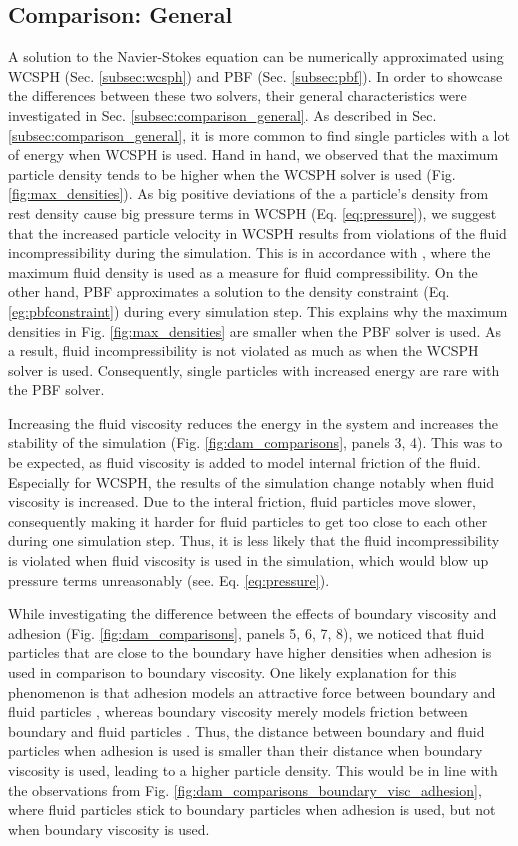 \documentclass[11pt, letterpaper, twocolumn]{article}
\begin{document}
\subsection{Comparison: General}
\label{disc:comparison_general}
A solution to the Navier-Stokes equation can be numerically approximated using WCSPH (Sec. \ref{subsec:wcsph}) and PBF (Sec. \ref{subsec:pbf}). In order to showcase the differences between these two solvers, their general characteristics were investigated in Sec. \ref{subsec:comparison_general}. As described in Sec. \ref{subsec:comparison_general},
it is more common to find single particles with a lot of energy when WCSPH is used. Hand in hand, we observed that the maximum particle density tends to be higher when the WCSPH solver is used (Fig. \ref{fig:max_densities}). As big positive deviations of the a particle's density from rest density cause big pressure terms in WCSPH (Eq. \ref{eq:pressure}), we suggest that
the increased particle velocity in WCSPH results from violations of the fluid incompressibility during the simulation. This is in accordance with \cite{macklin2013}, where the maximum fluid density is used as a measure for fluid compressibility. On the other hand, PBF approximates a solution to the density constraint (Eq. \ref{eg:pbfconstraint}) during 
every simulation step. This explains why the maximum densities in Fig. \ref{fig:max_densities} are smaller when the PBF solver is used. As a result, fluid incompressibility is not violated as much as when the WCSPH solver is used. Consequently, single particles with increased energy are rare with the PBF solver.  

Increasing the fluid viscosity reduces the energy in the system and increases the stability of the simulation (Fig. \ref{fig:dam_comparisons}, panels 3, 4). This was to be expected, as fluid viscosity is added to model internal friction of the fluid. Especially for WCSPH, the results of the simulation change notably when fluid viscosity is increased. Due 
to the interal friction, fluid particles move slower, consequently making it harder for fluid particles to get too close to each other during one simulation step. Thus, it is less likely that the fluid incompressibility is violated when fluid viscosity is used in the simulation, which would blow up pressure terms unreasonably (see. Eq. \ref{eq:pressure}).

While investigating the difference between the effects of boundary viscosity and adhesion (Fig. \ref{fig:dam_comparisons}, panels 5, 6, 7, 8), we noticed that fluid particles that are close to the boundary have higher densities when adhesion is used in comparison to boundary viscosity. One likely explanation for this phenomenon is that adhesion models an attractive
force between boundary and fluid particles \cite{akinci2013}, whereas boundary viscosity merely models friction between boundary and fluid particles \cite{akinci2012}. Thus, the distance between boundary and fluid particles when adhesion is used is smaller than their distance when boundary viscosity is used, leading to a higher particle density. This would be in line with the 
observations from Fig. \ref{fig:dam_comparisons_boundary_visc_adhesion}, where fluid particles stick to boundary particles when adhesion is used, but not when boundary viscosity is used.
\end{document}
